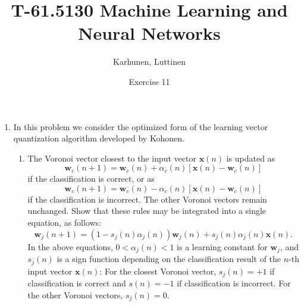 
\title{T-61.5130 Machine Learning and Neural Networks}
\author{Karhunen, Luttinen}
\date{Exercise 11}

\newcommand{\vect}[1]{{\bf{#1}}}
\newcommand{\svect}[1]{\boldsymbol{#1}}
\newcommand{\matr}[1]{\boldsymbol{#1}}




\maketitle

\begin{enumerate}

\item In this problem we consider the optimized form of the learning
  vector quantization algorithm developed by Kohonen.
  \begin{enumerate}
  \item The Voronoi vector closest to the input vector $\mathbf{x}(n)$
    is updated as
    \begin{equation}
      \mathbf{w}_c(n+1)=\mathbf{w}_c(n)+\alpha_c(n)[\mathbf{x}(n)-\mathbf{w}_c(n)]
      \label{equation: 1}
    \end{equation}
    if the classification is correct, or as
    \begin{equation}
      \mathbf{w}_c(n+1)=\mathbf{w}_c(n)-\alpha_c(n)[\mathbf{x}(n)-\mathbf{w}_c(n)]
      \label{equation: 2}
    \end{equation}
    if the classification is incorrect.  The other Voronoi vectors
    remain unchanged.  Show that these rules may be integrated into a
    single equation, as follows:
    \begin{equation}
      \mathbf{w}_j(n+1) = (1-s_j(n)\alpha_j(n)) \mathbf{w}_j(n) + s_j(n)
      \alpha_j(n) \mathbf{x}(n).
      \label{equation: 3}
    \end{equation}
    In the above equations, $0<\alpha_j(n)<1$ is a learning constant
    for $\mathbf{w}_j$, and $s_j(n)$ is a sign function depending on
    the classification result of the $n$-th input vector
    $\mathbf{x}(n)$: For the closest Voronoi vector, $s_j(n)=+1$ if
    classification is correct and $s(n)=-1$ if classification is
    incorrect.  For the other Voronoi vectors, $s_j(n)=0$.


\end{enumerate}
\end{enumerate}
